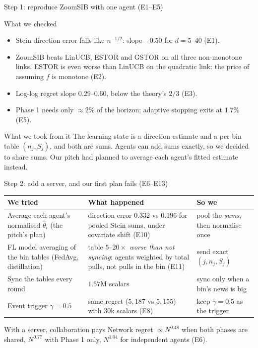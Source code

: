 \documentclass[11pt]{beamer}
\begin{document}
\begin{frame}{Step 1: reproduce ZoomSIB with one agent (E1--E5)}
\footnotesize
\begin{block}{What we checked}
\begin{itemize}
\item Stein direction error falls like $n^{-1/2}$: slope $-0.50$ for $d=5$--$40$ (E1).
\item ZoomSIB beats LinUCB, ESTOR and GSTOR on all three non-monotone links. ESTOR is even worse than LinUCB on the quadratic link: the price of assuming $f$ is monotone (E2).
\item Log-log regret slope $0.29$--$0.60$, below the theory's $2/3$ (E3).
\item Phase 1 needs only $\approx2\%$ of the horizon; adaptive stopping exits at $1.7\%$ (E5).
\end{itemize}
\end{block}
\begin{alertblock}{What we took from it}
The learning state is a direction estimate and a per-bin table $(n_j,S_j)$, and both are sums. Agents can add sums exactly, so we decided to share sums. Our pitch had planned to average each agent's fitted estimate instead.
\end{alertblock}
\end{frame}

\begin{frame}{Step 2: add a server, and our first plan fails (E6--E13)}
\scriptsize
\renewcommand{\arraystretch}{1.25}
\begin{tabular}{@{}>{\raggedright\arraybackslash}p{3.2cm}>{\raggedright\arraybackslash}p{4.1cm}>{\raggedright\arraybackslash}p{3.3cm}@{}}
\toprule
\textbf{We tried} & \textbf{What happened} & \textbf{So we}\\
\midrule
Average each agent's normalised $\hat\theta_i$ (the pitch's plan) & direction error $0.332$ vs $0.196$ for pooled Stein sums, under covariate shift (E10) & pool the \emph{sums}, then normalise once\\
FL model averaging of the bin tables (FedAvg, distillation) & table $5$--$20\times$ \emph{worse than not syncing}: agents weighted by total pulls, not pulls in the bin (E11) & send exact $(j,n_j,S_j)$\\
Sync the tables every round & $1.57$M scalars & sync only when a bin's news is big\\
Event trigger $\gamma=0.5$ & same regret ($5{,}187$ vs $5{,}155$) with $30$k scalars (E8) & keep $\gamma=0.5$ as the trigger\\
\bottomrule
\end{tabular}
\vspace{0.6em}
\begin{block}{With a server, collaboration pays}
Network regret $\propto N^{0.48}$ when both phases are shared, $N^{0.77}$ with Phase 1 only, $N^{1.04}$ for independent agents (E6).
\end{block}
\end{frame}
\end{document}
